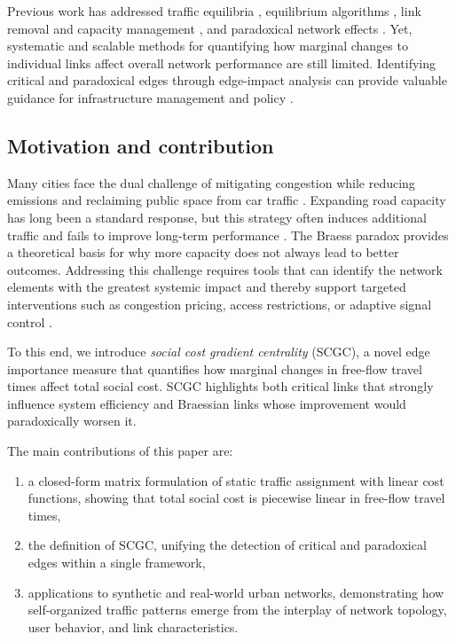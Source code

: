 \documentclass[twocolumn,english,groupedaddress, superscriptaddress,aps,pre,10pt,floatfix]{revtex4-2}
\begin{document}
Previous work has addressed traffic equilibria \citep{sheffi1985urban, patriksson1994traffic, florian1995network, smith1979existence}, equilibrium algorithms \citep{leblanc1975efficient, bargera2002origin, dial2006path}, link removal and capacity management \citep{nagurney2000emission, nagurney2009efficiency, xu2018critical, jenelius2006importance}, and paradoxical network effects \citep{zhang1997stability, pas1997braess, zhang2018braess}. Yet, systematic and scalable methods for quantifying how marginal changes to individual links affect overall network performance are still limited. Identifying critical and paradoxical edges through edge-impact analysis can provide valuable guidance for infrastructure management and policy \citep{passacantando2021braess, xu2018critical}.

\subsection{Motivation and contribution}

Many cities face the dual challenge of mitigating congestion while reducing emissions and reclaiming public space from car traffic \citep{newman2015end, cervero2013transport, creutzig2015transport}. Expanding road capacity has long been a standard response, but this strategy often induces additional traffic and fails to improve long-term performance \citep{downs1962law, duranton2011fundamental}. The Braess paradox provides a theoretical basis for why more capacity does not always lead to better outcomes. Addressing this challenge requires tools that can identify the network elements with the greatest systemic impact and thereby support targeted interventions such as congestion pricing, access restrictions, or adaptive signal control \citep{yang2005roadpricing, small2007economics, depalma2011congestion}.

To this end, we introduce \emph{social cost gradient centrality} (SCGC), a novel edge importance measure that quantifies how marginal changes in free-flow travel times affect total social cost. SCGC highlights both critical links that strongly influence system efficiency and Braessian links whose improvement would paradoxically worsen it.

The main contributions of this paper are:
\begin{enumerate}
    \item a closed-form matrix formulation of static traffic assignment with linear cost functions, showing that total social cost is piecewise linear in free-flow travel times,
    \item the definition of SCGC, unifying the detection of critical and paradoxical edges within a single framework,
    \item applications to synthetic and real-world urban networks, demonstrating how self-organized traffic patterns emerge from the interplay of network topology, user behavior, and link characteristics. 
\end{enumerate}
\end{document}

